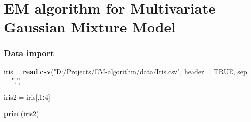 \documentclass[
]{article}
\author{}
\date{\vspace{-2.5em}}
\newenvironment{Shaded}{\begin{snugshade}}{\end{snugshade}}
\newcommand{\AttributeTok}[1]{\textcolor[rgb]{0.13,0.29,0.53}{#1}}
\newcommand{\ConstantTok}[1]{\textcolor[rgb]{0.56,0.35,0.01}{#1}}
\newcommand{\DecValTok}[1]{\textcolor[rgb]{0.00,0.00,0.81}{#1}}
\newcommand{\FunctionTok}[1]{\textcolor[rgb]{0.13,0.29,0.53}{\textbf{#1}}}
\newcommand{\NormalTok}[1]{#1}
\newcommand{\OtherTok}[1]{\textcolor[rgb]{0.56,0.35,0.01}{#1}}
\newcommand{\SpecialCharTok}[1]{\textcolor[rgb]{0.81,0.36,0.00}{\textbf{#1}}}
\newcommand{\StringTok}[1]{\textcolor[rgb]{0.31,0.60,0.02}{#1}}
\begin{document}
\section{EM algorithm for Multivariate Gaussian Mixture
Model}\label{em-algorithm-for-multivariate-gaussian-mixture-model}

\subsubsection{Data import}\label{data-import}

\begin{Shaded}
\begin{Highlighting}[]
\NormalTok{iris }\OtherTok{=} \FunctionTok{read.csv}\NormalTok{(}\StringTok{"D:/Projects/EM{-}algorithm/data/Iris.csv"}\NormalTok{, }\AttributeTok{header =} \ConstantTok{TRUE}\NormalTok{, }\AttributeTok{sep =} \StringTok{","}\NormalTok{) }

\NormalTok{iris2 }\OtherTok{=}\NormalTok{ iris[,}\DecValTok{1}\SpecialCharTok{:}\DecValTok{4}\NormalTok{]}

\FunctionTok{print}\NormalTok{(iris2)}
\end{Highlighting}
\end{Shaded}
\end{document}
